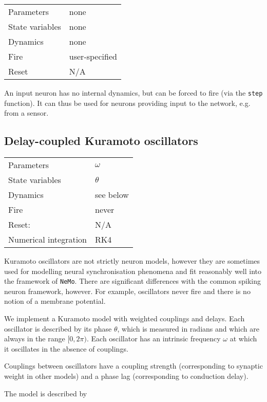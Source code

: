 \documentclass[a4paper]{article}
\newcommand{\nemo}{\texttt{NeMo}}
\newcommand{\code}[1]{\texttt{#1}}
\begin{document}
\begin{tabular}{ll}
Parameters	    & none           \\
State variables & none           \\
Dynamics        & none           \\
Fire            & user-specified \\
Reset           & N/A            \\
\end{tabular}

An input neuron has no internal dynamics, but can be forced to fire (via the \code{step} function).
It can thus be used for neurons providing input to the network,
	e.g. from a sensor.

\subsection{Delay-coupled Kuramoto oscillators}
\label{model:neuron:kuramoto}

\begin{tabular}{ll}
Parameters      & $\omega$  \\
State variables & $\theta$  \\
Dynamics        & see below \\
Fire            & never     \\
Reset:          & N/A       \\
Numerical integration & RK4 \\
\end{tabular}

Kuramoto oscillators are not strictly neuron models,
	however they are sometimes used for modelling neural synchronisation phenomena
	and fit reasonably well into the framework of \nemo.
There are significant differences with the common spiking neuron framework, however.
For example, oscillators never fire and there is no notion of a membrane potential.

We implement a Kuramoto model with weighted couplings and delays. 
Each oscillator is described by its phase $\theta$,
	which is measured in radians and which are always in the range $[0, 2\pi)$.
Each oscillator has an intrinsic frequency $\omega$ at which it oscillates in the
absence of couplings.

Couplings between oscillators have a coupling strength (corresponding to synaptic weight in other models) and a phase lag (corresponding to conduction delay).

The model is described by
\end{document}
